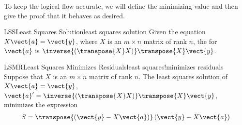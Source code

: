 %
To keep the logical flow accurate, we will define the minimizing value and then give the proof that it behaves as desired.
%
\begin{definition}{LSS}{Least Squares Solution}{least squares solution}
Given the equation $X\vect{a}=\vect{y}$, where $X$ is an $m\times n$ matrix of rank $n$, the  for $\vect{a}$ is $\inverse{\left(\transpose{X}X\right)}\transpose{X}\vect{y}$.
\end{definition}
%
%
\begin{theorem}{LSMR}{Least Squares Minimizes Residuals}{least squares!minimizes residuals}
Suppose that $X$ is an $m\times n$ matrix of rank $n$.  The least squares solution of $X\vect{a}=\vect{y}$, $\vect{a}^\prime=\inverse{\left(\transpose{X}X\right)}\transpose{X}\vect{y}$, minimizes the expression
%
\begin{align*}
S=\transpose{\left(\vect{y}-X\vect{a}\right)}\left(\vect{y}-X\vect{a}\right)
\end{align*}
%
\end{theorem}
%
